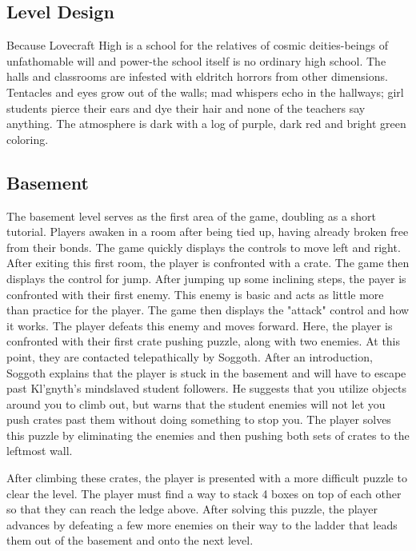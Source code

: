 \documentclass [12pt]{article}
\begin{document}
\subsection*{Level Design}

Because Lovecraft High is a school for the relatives of cosmic deities-beings of unfathomable will and power-the school itself is no ordinary high school. The halls and classrooms are infested with eldritch horrors from other dimensions. Tentacles and eyes grow out of the walls; mad whispers echo in the hallways; girl students pierce their ears and dye their hair and none of the teachers say anything. The atmosphere is dark with a log of purple, dark red and bright green coloring.

\subsection*{Basement}

The basement level serves as the first area of the game, doubling as a short tutorial. Players awaken in a room after being tied up, having already broken free from their bonds. The game quickly displays the controls to move left and right. After exiting this first room, the player is confronted with a crate. The game then displays the control for jump. After jumping up some inclining steps, the payer is confronted with their first enemy. This enemy is basic and acts as little more than practice for the player. The game then displays the "attack" control and how it works. The player defeats this enemy and moves forward. Here, the player is confronted with their first crate pushing puzzle, along with two enemies. At this point, they are contacted telepathically by Soggoth. After an introduction, Soggoth explains that the player is stuck in the basement and will have to escape past Kl'gnyth's mindslaved student followers. He suggests that you utilize objects around you to climb out, but warns that the student enemies will not let you push crates past them without doing something to stop you. The player solves this puzzle by eliminating the enemies and then pushing both sets of crates to the leftmost wall.

After climbing these crates, the player is presented with a more difficult puzzle to clear the level. The player must find a way to stack 4 boxes on top of each other so that they can reach the ledge above. After solving this puzzle, the player advances by defeating a few more enemies on their way to the ladder that leads them out of the basement and onto the next level.
\end{document}
